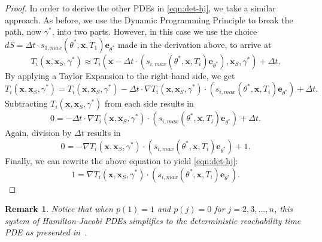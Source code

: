 \documentclass[pdflatex,sn-mathphys-num]{sn-jnl}%
\def \bx{{\mathbf {x}}}
\def \be{{\mathbf {e}}}
\theoremstyle{thmstyleone}%
\theoremstyle{thmstyletwo}%
\newtheorem{remark}{Remark}%
\theoremstyle{thmstylethree}%
\begin{document}
\begin{proof}
In order to derive the other PDEs in \eqref{eqn:det-hj}, we take a similar approach. As before, we use the Dynamic Programming Principle to break the path, now $\gamma^*$, into two parts.  However, in this case we use the choice $dS = \Delta t \cdot s_{1,max}(\theta^*,\bx,T_1)\be_{\theta^*}$
made in the derivation above, to arrive at  
\begin{equation}
        T_i(\bx,\bx_S,\gamma^*) \approx T_i(\bx-\Delta t \cdot (s_{i,max}(\theta^*,\bx,T_i)\be_{\theta^*}),\bx_S,\gamma^*) + \Delta t.
\end{equation}
By applying a Taylor Expansion to the right-hand side, we get
\begin{equation}
        T_i(\bx,\bx_S,\gamma^*) = T_i(\bx,\bx_S,\gamma^*) - \Delta t \cdot \nabla T_i(\bx,\bx_S,\gamma^*) \cdot (s_{i,max}(\theta^*,\bx,T_i)\be_{\theta^*}) + \Delta t.
\end{equation}
Subtracting $T_i(\bx,\bx_S,\gamma^*)$ from each side results in
\begin{equation}
        0 = - \Delta t \cdot \nabla T_i(\bx,\bx_S,\gamma^*) \cdot (s_{i,max}(\theta^*,\bx,T_i)\be_{\theta^*}) + \Delta t.
\end{equation}
Again, division by $\Delta t$ results in
    \begin{equation}
        0 =- \nabla T_i(\bx,\bx_S,\gamma^*) \cdot (s_{i,max}(\theta^*,\bx,T_i)\be_{\theta^*}) + 1.
    \end{equation}
Finally, we can rewrite the above equation to yield \eqref{eqn:det-hj}:
    \begin{equation}
        1 = \nabla T_i(\bx,\bx_S,\gamma^*) \cdot (s_{i,max}(\theta^*,\bx,T_i)\be_{\theta^*}).
    \end{equation}
\end{proof}

\begin{remark}
    Notice that when $p(1)=1$ and $p(j)=0$ for $j=2,3,...,n$, this system of Hamilton-Jacobi PDEs simplifies to the deterministic reachability time PDE as presented in~\cite{Brandman2023}.
\end{remark}
\end{document}
